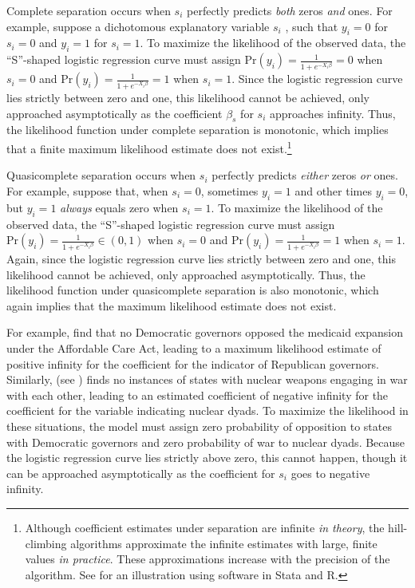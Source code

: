 \documentclass[12pt]{article}
\begin{document}
Complete separation occurs when $s_i$ perfectly predicts \emph{both} zeros \emph{and} ones. For example, suppose a dichotomous explanatory variable $s_i$ , such that $y_i = 0$ for $s_i = 0$ and $y_i = 1$ for $s_i = 1$. To maximize the likelihood of the observed data, the ``S''-shaped logistic regression curve must assign $\text{Pr}(y_i) = \frac{1}{1 + e^{-X_i\beta}} = 0$ when $s_i  = 0$ and $\text{Pr}(y_i) = \frac{1}{1 + e^{-X_i\beta}} = 1$ when $s_i = 1$. Since the logistic regression curve lies strictly between zero and one, this likelihood cannot be achieved, only approached asymptotically as the coefficient $\beta_s$ for $s_i$ approaches infinity. Thus, the likelihood function under complete separation is monotonic, which implies that a finite maximum likelihood estimate does not exist.\footnote{Although coefficient estimates under separation are infinite \emph{in theory}, the hill-climbing algorithms approximate the infinite estimates with large, finite values \emph{in practice}. These approximations increase with the precision of the algorithm. See \cite{Zorn2005} for an illustration using software in Stata and R.}

Quasicomplete separation occurs when $s_i$ perfectly predicts \emph{either} zeros \emph{or} ones. For example, suppose that,  when $s_i = 0$, sometimes $y_i = 1$ and other times $y_i = 0$, but $y_i = 1$ \emph{always} equals zero when $s_i = 1$. To maximize the likelihood of the observed data, the ``S''-shaped logistic regression curve must assign $\text{Pr}(y_i) = \frac{1}{1 + e^{-X_i\beta}} \in (0, 1)$ when $s_i  = 0$ and $\text{Pr}(y_i) = \frac{1}{1 + e^{-X_i\beta}} = 1$ when $s_i = 1$. Again, since the logistic regression curve lies strictly between zero and one, this likelihood cannot be achieved, only approached asymptotically. Thus, the likelihood function under quasicomplete separation is also monotonic, which again implies that the maximum likelihood estimate does not exist.

For example, \cite{BarrilleauxRainey2014} find that no Democratic governors opposed the medicaid expansion under the Affordable Care Act, leading to a maximum likelihood estimate of positive infinity for the coefficient for the indicator of Republican governors. Similarly, \cite{Rauchhaus2009} (see \citealt{BellMiller2014}) finds no instances of states with nuclear weapons engaging in war with each other, leading to an estimated coefficient of negative infinity for the coefficient for the variable indicating nuclear dyads. To maximize the likelihood in these situations, the model must assign zero probability of opposition to states with Democratic governors and zero probability of war to nuclear dyads. Because the logistic regression curve lies strictly above zero, this cannot happen, though it can be approached asymptotically as the coefficient for $s_i$ goes to negative infinity. 
\end{document}
